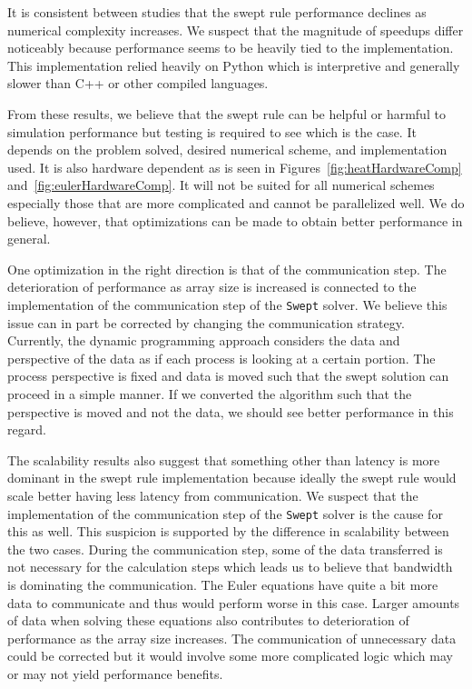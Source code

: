 \documentclass[review]{elsarticle}
\def\Swept{\texttt{Swept}}
\begin{document}
It is consistent between studies that the swept rule performance declines as numerical complexity increases. We suspect that the magnitude of speedups differ noticeably because performance seems to be heavily tied to the implementation. This implementation relied heavily on Python which is interpretive and generally slower than C++ or other compiled languages.  

From these results, we believe that the swept rule can be helpful or harmful to simulation performance but testing is required to see which is the case. It depends on the problem solved, desired numerical scheme, and implementation used. It is also hardware dependent as is seen in Figures~\ref{fig:heatHardwareComp} and~\ref{fig:eulerHardwareComp}. It will not be suited for all numerical schemes especially those that are more complicated and cannot be parallelized well. We do believe, however, that optimizations can be made to obtain better performance in general. 

One optimization in the right direction is that of the communication step. The deterioration of performance as array size is increased is connected to the implementation of the communication step of the \Swept{} solver. We believe this issue can in part be corrected by changing the communication strategy. Currently, the dynamic programming approach considers the data and perspective of the data as if each process is looking at a certain portion. The process perspective is fixed and data is moved such that the swept solution can proceed in a simple manner. If we converted the algorithm such that the perspective is moved and not the data, we should see better performance in this regard.

The scalability results also suggest that something other than latency is more dominant in the swept rule implementation because ideally the swept rule would scale better having less latency from communication. We suspect that the implementation of the communication step of the \Swept{} solver is the cause for this as well. This suspicion is supported by the difference in scalability between the two cases. During the communication step, some of the data transferred is not necessary for the calculation steps which leads us to believe that bandwidth is dominating the communication. The Euler equations have quite a bit more data to communicate and thus would perform worse in this case. Larger amounts of data when solving these equations also contributes to deterioration of performance as the array size increases. The communication of unnecessary data could be corrected but it would involve some more complicated logic which may or may not yield performance benefits.
\end{document}

